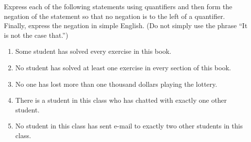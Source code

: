 \documentclass[../notes.tex]{subfiles}
\begin{document}
\begin{homework}
    Express each of the following statements using quantifiers and then form the negation of the statement so that no negation is to the left of a quantifier. Finally, express the negation in simple English. (Do not simply use the phrase ``It is not the case that.'')
    \begin{enumerate}[label=(\alph*)]
        \item Some student has solved every exercise in this book.
        \item No student has solved at least one exercise in every section of this book.
        \item No one has lost more than one thousand dollars playing the lottery.
        \item There is a student in this class who has chatted with exactly one other student.
        \item No student in this class has sent e-mail to exactly two other students in this class.
    \end{enumerate}
\end{homework}
\end{document}
